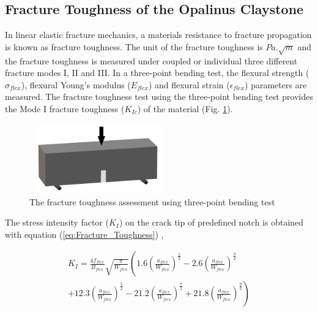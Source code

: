 \subsection{Fracture Toughness of the Opalinus Claystone}
\label{sec:Fracture_Toughness_Exp}

In linear elastic fracture mechanics, a materials resistance to fracture propagation is known as fracture toughness. The unit of the fracture toughness is $Pa.\sqrt m$ and the fracture toughness is measured under coupled or individual three different fracture modes I, II and III. In a three-point bending test, the flexural strength ($\sigma_{flex}$), flexural Young's modulus ($E_{flex}$) and flexural strain ($\epsilon_{flex}$) parameters are measured. The fracture toughness test using the three-point bending test provides the Mode I fracture toughness ($K_{Ic}$) of the material (Fig.  \ref{fig:Amir_Fracture_Toughness_Theory}).

\begin{figure}[!ht]
\centering
\includegraphics[width=6cm,height=3cm]{figures/Amir_Fracture_Toughness_Theory.png}
\caption{The fracture toughness assessment using three-point bending test}
\label{fig:Amir_Fracture_Toughness_Theory}
\end{figure} 

The stress intensity factor ($K_I$) on the crack tip of predefined notch is obtained with equation (\ref{eq:Fracture_Toughness}) \cite{Bower2009},

\begin{multline}
\label{eq:Fracture_Toughness}
K_I=
\frac{4f_{flex}}{B_{flex}}
\sqrt{\frac{\pi}{W_{flex}}}
\left(1.6
\left(\frac{a_{flex}}{W_{flex}}\right)^\frac{1}{2}
-
2.6\left(\frac{a_{flex}}{W_{flex}}\right)^\frac{3}{2} 
\right.
\\ 
\left.
+12.3\left(\frac{a_{flex}}{W_{flex}}\right)^\frac{5}{2} -21.2\left(\frac{a_{flex}}{W_{flex}}\right)^\frac{7}{2}
+21.8\left(\frac{a_{flex}}{W_{flex}}\right)^\frac{9}{2}
\right)
\end{multline}

